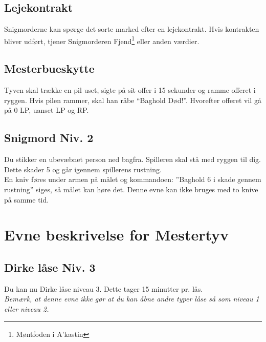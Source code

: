 



\subsection*{Lejekontrakt}
Snigmorderne kan spørge det sorte marked efter en lejekontrakt. Hvis kontrakten
bliver udført, tjener Snigmorderen Fjend\footnote{Møntfoden i A'kastin} eller anden værdier.\\

\subsection*{Mesterbueskytte}
Tyven skal trække en pil uset, sigte på sit offer i 15 sekunder og ramme offeret i ryggen. Hvis pilen rammer, skal han råbe “Baghold Død!”. Hvorefter offeret vil gå på 0 LP, uanset LP og RP.\\

\subsection*{Snigmord Niv. 2}
Du stikker en ubevæbnet person ned bagfra. Spilleren skal stå med ryggen til dig. Dette skader 5 og går igennem spillerens rustning.\\ 
En kniv føres under armen på målet og kommandoen: ”Baghold 6 i skade gennem rustning” siges, så målet kan høre det. Denne evne kan ikke bruges med to knive på samme tid.\\

\section*{Evne beskrivelse for Mestertyv}

\subsection*{Dirke låse Niv. 3}
Du kan nu Dirke låse niveau 3. Dette tager 15 minutter pr. lås.\\
\emph{Bemærk, at denne evne ikke gør at du kan åbne andre typer låse så som niveau 1 eller niveau 2.}\\

